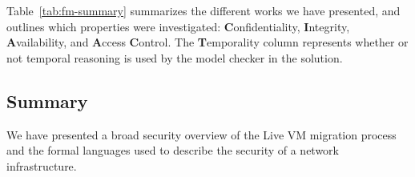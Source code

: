 Table~\ref{tab:fm-summary} summarizes the different works we have presented, and outlines which properties were investigated: \textbf{C}onfidentiality, \textbf{I}ntegrity, \textbf{A}vailability, and \textbf{A}ccess \textbf{C}ontrol. 
The \textbf{T}emporality column represents whether or not temporal reasoning is used by the model checker in the solution.
\begin{table}[ht]
\caption{Summary of formal models}
\label{tab:fm-summary}
\end{table}

\subsection{Summary}
We have presented a broad security overview of the Live VM migration process and the formal languages used to describe the security of a network infrastructure.

